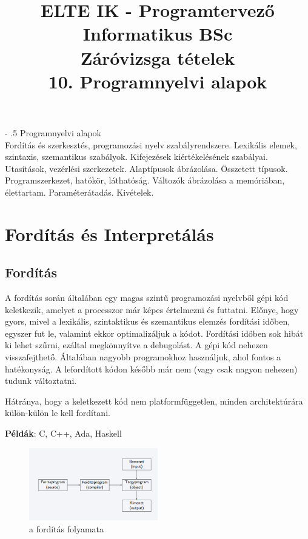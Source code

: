 \documentclass[margin=0px]{article}
\title{\textbf{{\Large ELTE IK - Programtervező Informatikus BSc} \vspace{0.2cm} \\ {\huge Záróvizsga tételek}} \vspace{0.3cm} \\ 10. Programnyelvi alapok}
\author{}
\date{}
\makeatletter
\renewcommand\paragraph{%
    \@startsection{paragraph}{4}{0mm}%
    {-\baselineskip}%
    {.5\baselineskip}%
    {\normalfont\normalsize\bfseries}}
\newenvironment{tetel}[1]{\paragraph{#1 \\}}{}
\makeatother
\begin{document}
\maketitle

\begin{tetel}{Programnyelvi alapok}
    Fordítás és szerkesztés, programozási nyelv szabályrendszere. Lexikális elemek, szintaxis, szemantikus szabályok. Kifejezések kiértékelésének szabályai. Utasítások, vezérlési szerkezetek. Alaptípusok ábrázolása. Összetett típusok. Programszerkezet, hatókör, láthatóság. Változók ábrázolása a memóriában, élettartam. Paraméterátadás. Kivételek.
\end{tetel}

\section{Fordítás és Interpretálás}

\subsection{Fordítás}

A fordítás során általában egy magas szintű programozási nyelvből gépi kód keletkezik, amelyet a processzor már képes értelmezni és futtatni. Előnye, hogy gyors, mivel a lexikális, szintaktikus és szemantikus elemzés fordítási időben, egyszer fut le, valamint ekkor optimalizáljuk a kódot. Fordítási időben sok hibát ki lehet szűrni, ezáltal megkönnyítve a debugolást. A gépi kód nehezen visszafejthető. Általában nagyobb programokhoz használjuk, ahol fontos a hatékonyság. A lefordított kódon később már nem (vagy csak nagyon nehezen) tudunk változtatni.

Hátránya, hogy a keletkezett kód nem platformfüggetlen, minden architektúrára külön-külön le kell fordítani.

\textbf{Példák}: C, C++, Ada, Haskell

\begin{figure}[H]
    \centering
    \includegraphics[width=0.5\textwidth]{img/forditas_folyamatabra.png}
    \caption{a fordítás folyamata}
    \label{fig:forditas_folyamatabra}
\end{figure}
\end{document}
